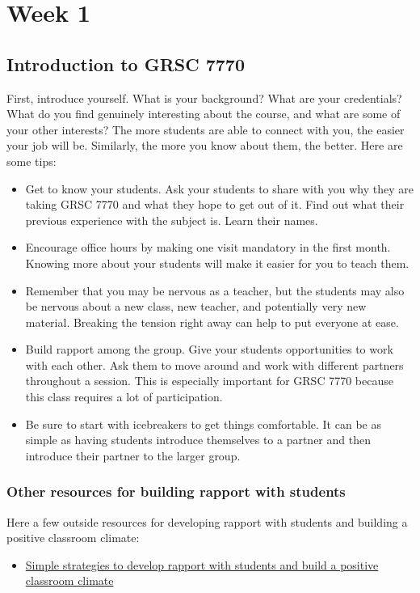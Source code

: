 \section{Week 1}
\label{sec:week-1}

\subsection{Introduction to GRSC 7770}
\label{sec:intr-grsc-7770}

First, introduce yourself. What is your background? What are your credentials? What do you find genuinely interesting about the course, and what are some of your other interests? The more students are able to connect with you, the easier your job will be. Similarly, the more you know about them, the better.  Here are some tips:

\begin{itemize}
\item Get to know your students. Ask your students to share with you why they are taking GRSC 7770 and what they hope to get out of it. Find out what their previous experience with the subject is. Learn their names. 
\item Encourage office hours by making one visit mandatory in the first month. Knowing more about your students will make it easier for you to teach them. 
\item Remember that you may be nervous as a teacher, but the students may also be nervous about a new class, new teacher, and potentially very new material. Breaking the tension right away can help to put everyone at ease.
\item Build rapport among the group.  Give your students opportunities to work with each other. Ask them to move around and work with different partners throughout a session.  This is especially important for GRSC 7770 because this class requires a lot of participation. 
\item Be sure to start with icebreakers to get things comfortable. It can be as simple as having students introduce themselves to a partner and then introduce their partner to the larger group.
\end{itemize}

\subsubsection{Other resources for building rapport with students}
\label{sec:other-reso-build}

Here a few outside resources for developing rapport with students and building a positive classroom climate:
\begin{itemize}
\item \href{run:/Lectures/Week-1/BuildingRapport.pdf}{Simple strategies to develop rapport with students and build a positive classroom climate}
\end{itemize}



